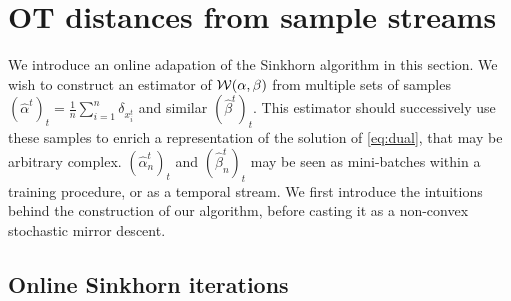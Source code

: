 
\section{OT distances from sample streams}

We introduce an online adapation of the Sinkhorn algorithm in this section. We
wish to construct an estimator of $\mathcal{W}(\alpha,\beta)$ from multiple sets of
samples $(\hat \alpha^t)_t = \frac{1}{n} \sum_{i=1}^n \delta_{x_i^t}$
 and similar $(\hat \beta^t)_t$. This estimator should
successively use these samples to enrich a representation of the solution of
\eqref{eq:dual}, that may be arbitrary complex. $(\hat \alpha_n^t)_t$ and $(\hat
\beta_n^t)_t$ may be seen as mini-batches within a training procedure, or as a
temporal stream. We first introduce the intuitions behind the construction of
our algorithm, before casting it as a non-convex stochastic mirror descent.

\subsection{Online Sinkhorn iterations}

